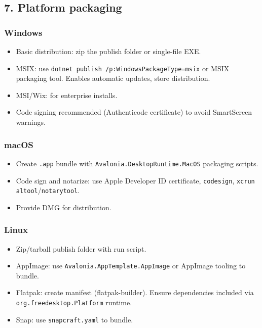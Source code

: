 \subsection{7. Platform packaging}\label{platform-packaging}

\subsubsection{Windows}\label{windows-2}

\begin{itemize}
\tightlist
\item
  Basic distribution: zip the publish folder or single-file EXE.
\item
  MSIX: use
  \passthrough{\lstinline!dotnet publish /p:WindowsPackageType=msix!} or
  MSIX packaging tool. Enables automatic updates, store distribution.
\item
  MSI/Wix: for enterprise installs.
\item
  Code signing recommended (Authenticode certificate) to avoid
  SmartScreen warnings.
\end{itemize}

\subsubsection{macOS}\label{macos-2}

\begin{itemize}
\tightlist
\item
  Create \passthrough{\lstinline!.app!} bundle with
  \passthrough{\lstinline!Avalonia.DesktopRuntime.MacOS!} packaging
  scripts.
\item
  Code sign and notarize: use Apple Developer ID certificate,
  \passthrough{\lstinline!codesign!},
  \passthrough{\lstinline!xcrun altool!}/\passthrough{\lstinline!notarytool!}.
\item
  Provide DMG for distribution.
\end{itemize}

\subsubsection{Linux}\label{linux-1}

\begin{itemize}
\tightlist
\item
  Zip/tarball publish folder with run script.
\item
  AppImage: use \passthrough{\lstinline!Avalonia.AppTemplate.AppImage!}
  or AppImage tooling to bundle.
\item
  Flatpak: create manifest (flatpak-builder). Ensure dependencies
  included via \passthrough{\lstinline!org.freedesktop.Platform!}
  runtime.
\item
  Snap: use \passthrough{\lstinline!snapcraft.yaml!} to bundle.
\end{itemize}

